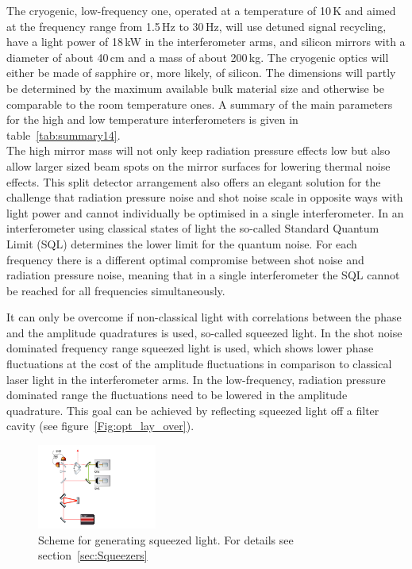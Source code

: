 The cryogenic, low-frequency one, operated at a temperature of 10\,K and aimed at the 
frequency range from 1.5\,Hz to 30\,Hz, will use detuned signal recycling, have a 
light power of 18\,kW in the interferometer arms, and silicon mirrors with a diameter of about 40\,cm and a mass of about 200\,kg. The cryogenic optics will either be made of sapphire or, 
more likely, of silicon. The dimensions will partly be determined by the maximum 
available bulk material size and otherwise be comparable to the room temperature 
ones. A summary of the main parameters for the high and low temperature 
interferometers is given in table~\ref{tab:summary14}.\\
The high mirror mass will not only keep radiation pressure effects low but also 
allow larger sized beam spots on the mirror surfaces for lowering thermal noise 
effects. This split detector arrangement also offers an elegant solution for the 
challenge that radiation pressure noise and shot noise scale in opposite ways with 
light power and cannot individually be optimised in a single interferometer. In an 
interferometer using classical states of light the so-called Standard Quantum 
Limit (SQL) determines the lower limit for the quantum noise. For each frequency 
there is a different optimal compromise between shot noise and radiation pressure 
noise, meaning that in a single interferometer the SQL cannot be reached for all 
frequencies simultaneously. 
 

It can only be overcome if non-classical light with correlations between the phase 
and the amplitude quadratures is used, so-called squeezed light. In the shot noise 
dominated frequency range squeezed light is used, which shows lower phase 
fluctuations at the cost of the amplitude fluctuations in comparison to classical 
laser light in the interferometer arms. In the low-frequency, radiation pressure 
dominated range the fluctuations need to be lowered in the amplitude quadrature. 
This goal can be achieved by reflecting squeezed light off a filter cavity (see 
figure~\ref{Fig:opt_lay_over}). 
\begin{figure}
\vspace{0.5cm}
	\centering
		\includegraphics[width=0.35\textwidth]{Intro/Intro_Figures/SqzGenIntro.pdf}
	\caption{Scheme for generating squeezed light. For details see section~\ref{sec:Squeezers}}
	\label{fig:SqzGenIntro}
\end{figure} 


